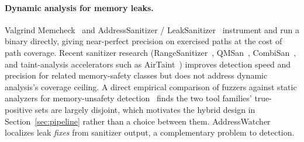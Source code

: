 \documentclass[11pt,a4paper]{article}
\begin{document}
\paragraph{Dynamic analysis for memory leaks.}
Valgrind Memcheck~\cite{valgrind} and
AddressSanitizer / LeakSanitizer~\cite{asan} instrument and run a binary
directly, giving near-perfect precision on exercised paths at the cost of
path coverage. Recent sanitizer research (RangeSanitizer~\cite{rangesan},
QMSan~\cite{qmsan}, CombiSan~\cite{combisan}, and taint-analysis
accelerators such as AirTaint~\cite{airtaint}) improves detection speed and
precision for related memory-safety classes but does not address dynamic
analysis's coverage ceiling. A direct empirical comparison of fuzzers
against static analyzers for memory-unsafety detection~\cite{fuzzer-vs-sa}
finds the two tool families' true-positive sets are largely disjoint,
which motivates the hybrid design in Section~\ref{sec:pipeline} rather than a
choice between them. AddressWatcher~\cite{addresswatcher} localizes leak
\emph{fixes} from sanitizer output, a complementary problem to detection.
\end{document}
